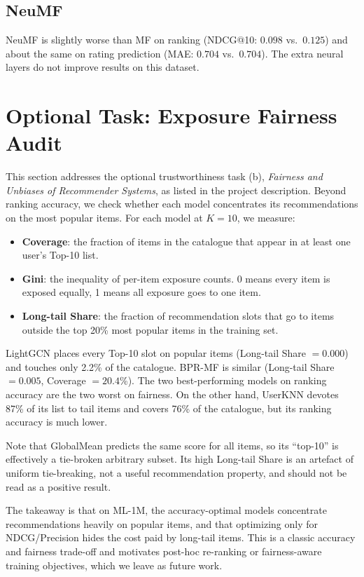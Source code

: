 \documentclass[sigconf,nonacm]{acmart}
\begin{document}
\subsection{NeuMF}
NeuMF is slightly worse than MF on ranking (NDCG@10: $0.098$ vs.\ $0.125$)
and about the same on rating prediction (MAE: $0.704$ vs.\ $0.704$). The
extra neural layers do not improve results on this dataset.

\section{Optional Task: Exposure Fairness Audit}\label{sec:fair}
This section addresses the optional trustworthiness task (b), \emph{Fairness
and Unbiases of Recommender Systems}, as listed in the project description.
Beyond ranking accuracy, we check whether each model concentrates its
recommendations on the most popular items. For each model at $K = 10$, we
measure:
\begin{itemize}[leftmargin=*]
\item \textbf{Coverage}: the fraction of items in the catalogue that appear in at least one user's Top-10 list.
\item \textbf{Gini}: the inequality of per-item exposure counts. 0 means every item is exposed equally, 1 means all exposure goes to one item.
\item \textbf{Long-tail Share}: the fraction of recommendation slots that go to items outside the top 20\% most popular items in the training set.
\end{itemize}



LightGCN places every Top-10 slot on popular items (Long-tail Share
$= 0.000$) and touches only 2.2\% of the catalogue. BPR-MF is similar
(Long-tail Share $= 0.005$, Coverage $= 20.4$\%). The two best-performing
models on ranking accuracy are the two worst on fairness. On the other
hand, UserKNN devotes 87\% of its list to tail items and covers 76\% of
the catalogue, but its ranking accuracy is much lower.

Note that GlobalMean predicts the same score for all items, so its
``top-10'' is effectively a tie-broken arbitrary subset. Its high
Long-tail Share is an artefact of uniform tie-breaking, not a useful
recommendation property, and should not be read as a positive result.

The takeaway is that on ML-1M, the accuracy-optimal models concentrate
recommendations heavily on popular items, and that optimizing only for
NDCG/Precision hides the cost paid by long-tail items. This is a classic
accuracy and fairness trade-off and motivates post-hoc re-ranking or
fairness-aware training objectives, which we leave as future work.
\end{document}

